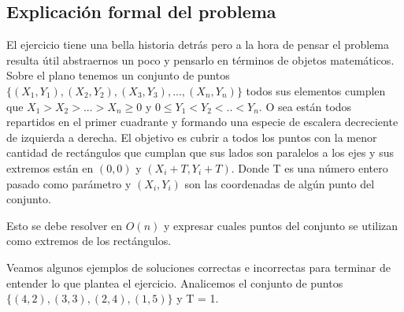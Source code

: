 \subsection{Explicación formal del problema}

El ejercicio tiene una bella historia detrás pero a la hora de pensar el problema resulta útil abstraernos un poco y pensarlo en términos de objetos matemáticos. Sobre el plano tenemos un conjunto de puntos $ \{ (X_1,Y_1), (X_2,Y_2), (X_3,Y_3),..., (X_n,Y_n) \} $ todos sus elementos cumplen que $X_1 > X_2 > ... > X_n \geq 0 $ y $ 0 \leq Y_1 < Y_2 < .. < Y_n $. O sea están todos repartidos en el primer cuadrante y formando una especie de escalera decreciente de izquierda a derecha. El objetivo es cubrir a todos los puntos con la menor cantidad de rectángulos que cumplan que sus lados son paralelos a los ejes y sus extremos están en $ (0,0) $ y $ (X_i + T, Y_i + T) $. Donde T es una número entero pasado como parámetro y $(X_i,Y_i)$ son las coordenadas de algún punto del conjunto.

Esto se debe resolver en $ O(n)$ y expresar cuales puntos del conjunto se utilizan como extremos de los rectángulos.

Veamos algunos ejemplos de soluciones correctas e incorrectas para terminar de entender lo que plantea el ejercicio. Analicemos el conjunto de puntos $\{(4,2),(3,3),(2,4),(1,5)\}$ y T = 1.

